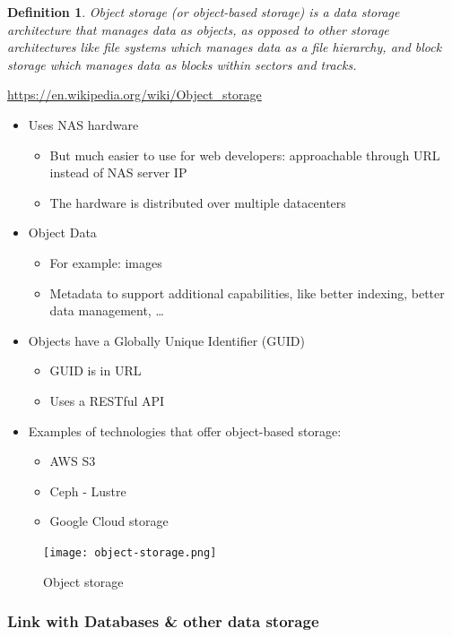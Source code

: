 \documentclass{article}
\newtheorem{theorem}{Definition}[section]
\begin{document}
\begin{theorem}
    Object storage (or object-based storage) is a data storage architecture that manages data as objects,
    as opposed to other storage architectures like file systems which manages data as a file hierarchy,
    and block storage which manages data as blocks within sectors and tracks.
\end{theorem}

\url{https://en.wikipedia.org/wiki/Object_storage}

\begin{itemize}
    \item Uses NAS hardware
    \begin{itemize}
        \item But much easier to use for web developers: approachable through URL instead of NAS server IP
        \item The hardware is distributed over multiple datacenters
    \end{itemize}
    \item Object Data
    \begin{itemize}
        \item For example: images
        \item Metadata to support additional capabilities, like better indexing, better data management, \dots
    \end{itemize}
    \item Objects have a Globally Unique Identifier (GUID)
    \begin{itemize}
        \item GUID is in URL
        \item Uses a RESTful API
    \end{itemize}
    \item Examples of technologies that offer object-based storage:
    \begin{itemize}
        \item AWS S3
        \item Ceph - Lustre
        \item Google Cloud storage
    \end{itemize}
\end{itemize}

\begin{figure}[H]
    \centering
    \texttt{[image: object-storage.png]}
    \caption{Object storage}
\end{figure}

\subsubsection{Link with Databases \& other data storage}
\end{document}
